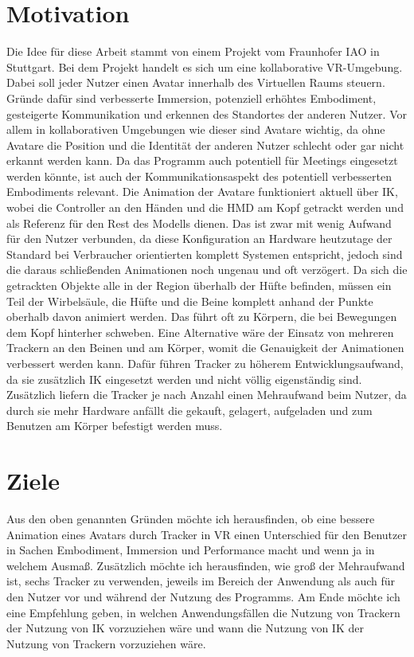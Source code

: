 \section{Motivation}
Die Idee für diese Arbeit stammt von einem Projekt vom Fraunhofer IAO in Stuttgart. Bei dem Projekt handelt es sich um eine kollaborative VR-Umgebung. Dabei soll jeder Nutzer einen Avatar innerhalb des Virtuellen Raums steuern. 
Gründe dafür sind verbesserte Immersion, potenziell erhöhtes Embodiment, gesteigerte Kommunikation und erkennen des Standortes der anderen Nutzer. Vor allem in kollaborativen Umgebungen wie dieser sind Avatare wichtig, da ohne Avatare die Position und die Identität der anderen Nutzer schlecht oder gar nicht erkannt werden kann. Da das Programm auch potentiell für Meetings eingesetzt werden könnte, ist auch der Kommunikationsaspekt des potentiell verbesserten Embodiments relevant. Die Animation der Avatare funktioniert aktuell über IK, wobei die Controller an den Händen und die HMD am Kopf getrackt werden und als Referenz für den Rest des Modells dienen. Das ist zwar mit wenig Aufwand für den Nutzer verbunden, da diese Konfiguration an Hardware heutzutage der Standard bei Verbraucher orientierten komplett Systemen entspricht, jedoch sind die daraus schließenden Animationen noch ungenau und oft verzögert. Da sich die getrackten Objekte alle in der Region überhalb der Hüfte befinden, müssen ein Teil der Wirbelsäule, die Hüfte und die Beine komplett anhand der Punkte oberhalb davon animiert werden. Das führt oft zu Körpern, die bei Bewegungen dem Kopf hinterher schweben.
Eine Alternative wäre der Einsatz von mehreren Trackern an den Beinen und am Körper, womit die Genauigkeit der Animationen verbessert werden kann. Dafür führen Tracker zu höherem Entwicklungsaufwand, da sie zusätzlich IK eingesetzt werden und nicht völlig eigenständig sind. Zusätzlich liefern die Tracker je nach Anzahl einen Mehraufwand beim Nutzer, da durch sie mehr Hardware anfällt die gekauft, gelagert, aufgeladen und zum Benutzen am Körper befestigt werden muss.


\section{Ziele}
Aus den oben genannten Gründen möchte ich herausfinden, ob eine bessere Animation eines Avatars durch Tracker in VR einen Unterschied für den Benutzer in Sachen Embodiment, Immersion und Performance macht und wenn ja in welchem Ausmaß. 
Zusätzlich möchte ich herausfinden, wie groß der Mehraufwand ist, sechs Tracker zu verwenden, jeweils im Bereich der Anwendung als auch für den Nutzer vor und während der Nutzung des Programms.
Am Ende möchte ich eine Empfehlung geben, in welchen Anwendungsfällen die Nutzung von Trackern der Nutzung von IK vorzuziehen wäre und wann die Nutzung von IK der Nutzung von Trackern vorzuziehen wäre.


